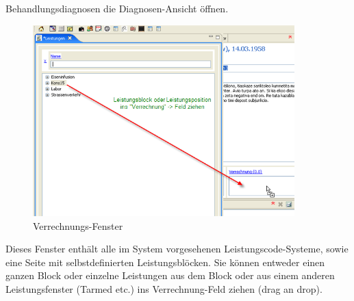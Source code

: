 \glqq Behandlungsdiagnosen\grqq{} die Diagnosen-Ansicht öffnen.\bigskip
\begin{figure}[ht]
	\includegraphics[width=0.9\textwidth]{images/einf7}
	\caption{Verrechnungs-Fenster}
	\label{fig:Verrechnung}
\end{figure}
Dieses Fenster enthält alle im System vorgesehenen Leistungscode-Systeme, sowie eine Seite mit selbstdefinierten Leistungsblöcken.
Sie können entweder einen ganzen Block oder einzelne Leistungen aus dem Block oder aus einem anderen Leistungsfenster (Tarmed etc.)
ins \glqq Verrechnung\grqq{}-Feld ziehen (drag an drop).

